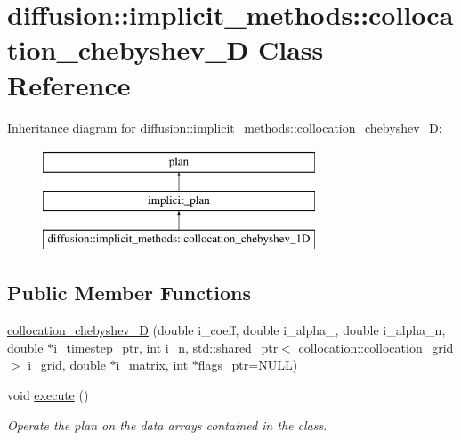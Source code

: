 \hypertarget{classdiffusion_1_1implicit__methods_1_1collocation__chebyshev__1_d}{\section{diffusion\-:\-:implicit\-\_\-methods\-:\-:collocation\-\_\-chebyshev\-\_\-D Class Reference}
\label{classdiffusion_1_1implicit__methods_1_1collocation__chebyshev__1_d}
}
Inheritance diagram for diffusion\-:\-:implicit\-\_\-methods\-:\-:collocation\-\_\-chebyshev\-\_\-D\-:\begin{figure}[H]
\begin{center}
\leavevmode
\includegraphics[height=3.000000cm]{classdiffusion_1_1implicit__methods_1_1collocation__chebyshev__1_d}
\end{center}
\end{figure}
\subsection*{Public Member Functions}
\begin{DoxyCompactItemize}
\item 
\hyperlink{classdiffusion_1_1implicit__methods_1_1collocation__chebyshev__1_d_a589c4c2ad2fa2c8ee4ff5731077d0bd0}{collocation\-\_\-chebyshev\-\_\-D} (double i\-\_\-coeff, double i\-\_\-alpha\-\_, double i\-\_\-alpha\-\_\-n, double $\ast$i\-\_\-timestep\-\_\-ptr, int i\-\_\-n, std\-::shared\-\_\-ptr$<$ \hyperlink{classcollocation_1_1collocation__grid}{collocation\-::collocation\-\_\-grid} $>$ i\-\_\-grid, double $\ast$i\-\_\-matrix, int $\ast$flags\-\_\-ptr=N\-U\-L\-L)
\item 
void \hyperlink{classdiffusion_1_1implicit__methods_1_1collocation__chebyshev__1_d_ac5682ef7086a8f907318d8f031dc73f4}{execute} ()
\begin{DoxyCompactList}\small\item\em Operate the plan on the data arrays contained in the class. \end{DoxyCompactList}\end{DoxyCompactItemize}
